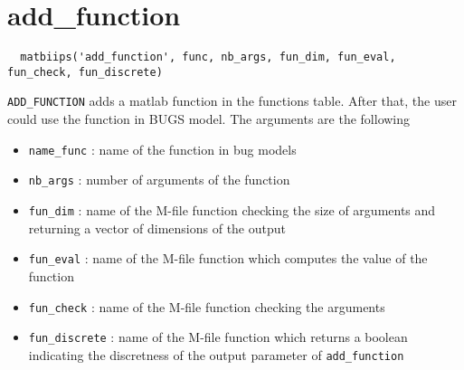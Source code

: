 \documentclass[11pt,twoside]{article}
\begin{document}
\section{add\_function}

 \begin{lstlisting}
  matbiips('add_function', func, nb_args, fun_dim, fun_eval, fun_check, fun_discrete)
 \end{lstlisting}

 \texttt{ADD\_FUNCTION} adds a matlab function in the functions table. After that, the user could use the function in BUGS model. The arguments are the following

 \begin{itemize}
  \item \texttt{name\_func} : name of the function in bug models
  \item \texttt{nb\_args} : number of arguments of the function
  \item \texttt{fun\_dim} : name of the M-file function checking the size of arguments and returning a vector of dimensions of the output
  \item \texttt{fun\_eval} : name of the M-file function which computes the value of the function
  \item \texttt{fun\_check} : name of the M-file function checking the arguments
  \item \texttt{fun\_discrete} : name of the M-file function which returns a boolean indicating the discretness of the output parameter of \texttt{add\_function}
\end{itemize}
\end{document}
